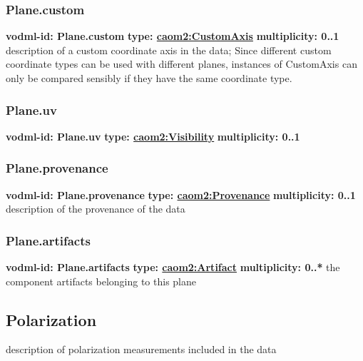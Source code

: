     \subsubsection{Plane.custom}
      \textbf{vodml-id: Plane.custom} \newline
      \textbf{type: \hyperref[sect:CustomAxis]{caom2:CustomAxis}} \newline
      \textbf{multiplicity: 0..1} \newline
      description of a custom coordinate axis in the data; Since different custom coordinate types can be used with different planes, instances of CustomAxis can only be compared sensibly if they have the same coordinate type.

    \subsubsection{Plane.uv}
      \textbf{vodml-id: Plane.uv} \newline
      \textbf{type: \hyperref[sect:Visibility]{caom2:Visibility}} \newline
      \textbf{multiplicity: 0..1} 

    \subsubsection{Plane.provenance}
      \textbf{vodml-id: Plane.provenance} \newline
      \textbf{type: \hyperref[sect:Provenance]{caom2:Provenance}} \newline
      \textbf{multiplicity: 0..1} \newline
      description of the provenance of the data

    \subsubsection{Plane.artifacts}
      \textbf{vodml-id: Plane.artifacts} \newline
      \textbf{type: \hyperref[sect:Artifact]{caom2:Artifact}} \newline
      \textbf{multiplicity: 0..*} \newline
      the component artifacts belonging to this plane

  \subsection{Polarization}
  \label{sect:Polarization}
    description of polarization measurements included in the data

